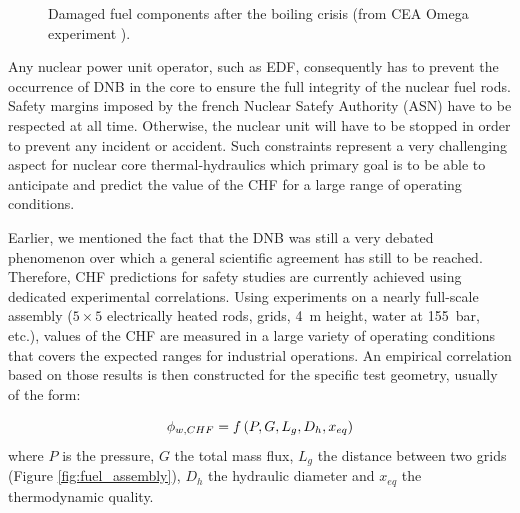 \begin{figure}[!h]
\caption{Damaged fuel components after the boiling crisis (from CEA Omega experiment \cite{faccanoni_etude_2008}).}
\label{fig:chf_fuel}
\end{figure}

\npar

Any nuclear power unit operator, such as EDF, consequently has to prevent the occurrence of DNB in the core to ensure the full integrity of the nuclear fuel rods. Safety margins imposed by the french Nuclear Satefy Authority (ASN) have to be respected at all time. Otherwise, the nuclear unit will have to be stopped in order to prevent any incident or accident. Such constraints represent a very challenging aspect for nuclear core thermal-hydraulics which primary goal is to be able to anticipate and predict the value of the CHF for a large range of operating conditions.

\npar

Earlier, we mentioned the fact that the DNB was still a very debated phenomenon over which a general scientific agreement has still to be reached. Therefore, CHF predictions for safety studies are currently achieved using dedicated experimental correlations. Using experiments on a nearly full-scale assembly ($5 \times 5$ electrically heated rods, grids, 4\ m height, water at 155\ bar, etc.), values of the CHF are measured in a large variety of operating conditions that covers the expected ranges for industrial operations. An empirical correlation based on those results is then constructed for the specific test geometry, usually of the form:

\begin{equation}
\phi_{w,CHF} = f\left( P, G, L_{g}, D_{h}, x_{eq} \right)
\end{equation}
where $P$ is the pressure, $G$ the total mass flux, $L_{g}$ the distance between two grids (Figure \ref{fig:fuel_assembly}), $D_{h}$ the hydraulic diameter and $x_{eq}$ the thermodynamic quality.


